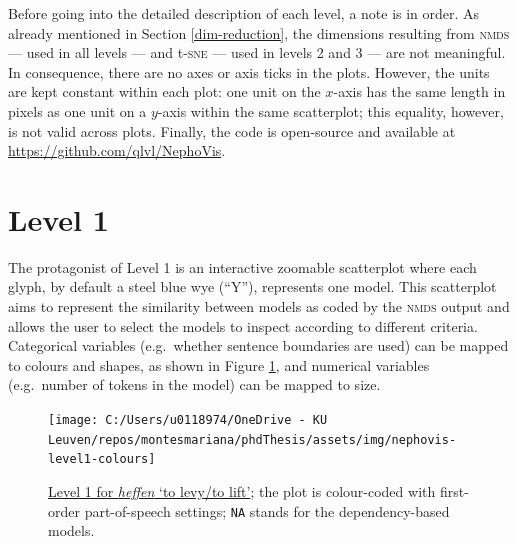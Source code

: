 \documentclass[
]{book}
\begin{document}
Before going into the detailed description of each level, a note is in order. As already mentioned in Section \ref{dim-reduction}, the dimensions resulting from \textsc{nmds} --- used in all levels --- and t-\textsc{sne} --- used in levels 2 and 3 --- are not meaningful. In consequence, there are no axes or axis ticks in the plots. However, the units are kept constant within each plot: one unit on the \(x\)-axis has the same length in pixels as one unit on a \(y\)-axis within the same scatterplot; this equality, however, is not valid across plots. Finally, the code is open-source and available at \url{https://github.com/qlvl/NephoVis}.

\hypertarget{nepho1}{%
\section{Level 1}\label{nepho1}}

The protagonist of Level 1 is an interactive zoomable scatterplot where each glyph, by default a steel blue wye (``Y''), represents one model. This scatterplot aims to represent the similarity between models as coded by the \textsc{nmds} output and allows the user to select the models to inspect according to different criteria. Categorical variables (e.g.~whether sentence boundaries are used) can be mapped to colours and shapes, as shown in Figure \ref{fig:nepho1-colours}, and numerical variables (e.g.~number of tokens in the model) can be mapped to size.



\begin{figure}
\texttt{[image: C:/Users/u0118974/OneDrive - KU Leuven/repos/montesmariana/phdThesis/assets/img/nephovis-level1-colours]} \caption{\href{https://qlvl.github.io/NephoVis/level1.html?type=heffen}{Level 1 for \emph{heffen} `to levy/to lift'}; the plot is colour-coded with first-order part-of-speech settings; \texttt{NA} stands for the dependency-based models.}\label{fig:nepho1-colours}
\end{figure}
\end{document}
